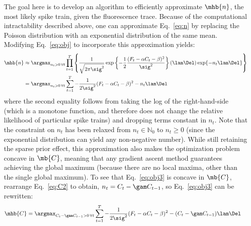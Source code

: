 The goal here is to develop an algorithm to efficiently approximate $\mhb{n}$, the most likely spike train, given the fluorescence trace. Because of the computational intractability described above, one can approximate Eq.~\eqref{eq:n} by replacing the Poisson distribution with an exponential distribution of the same mean. Modifying Eq.~\eqref{eq:obj} to incorporate this approximation yields:
\begin{subequations}
\begin{align} \label{eq:obj2}
\mhb{n} &\approx \argmax_{n_t>0 \, \forall t} \prod_{t=1}^T  \left\{\frac{1}{\sqrt{2 \pi \sig^2}} \exp \left\{-\frac{1}{2}\frac{(F_t - \alpha C_t - \beta)^2}{\sig^2}\right\}  (\lam\Del) \exp\{-n_t \lam\Del \}\right\}
\\ &= \argmax_{n_t>0 \, \forall t}  \sum_{t=1}^T -\frac{1}{2 \sig^2}(F_t - \alpha C_t - \beta)^2  - n_t \lam \Del  \label{eq:obj3}
\end{align}
\end{subequations}
where the second equality follows from taking the log of the right-hand-side (which is a monotone function, and therefore does not change the relative likelihood of particular spike trains) and dropping terms constant in $n_t$.  Note that the constraint on $n_t$ has been relaxed from  $n_t \in \mathbb{N}_0$ to $n_t \geq 0$ (since the exponential distribution can yield any non-negative number).  While still retaining the sparse prior effect, this approximation also makes the optimization problem concave in $\mb{C}$, meaning that any gradient ascent method guarantees achieving the global maximum (because there are no local maxima, other than the single global maximum).  To see that Eq.~\eqref{eq:obj3} is concave in $\mb{C}$, rearrange Eq.~\eqref{eq:C2} to obtain, $n_t=C_t-\gam C_{t-1}$, so Eq.~\eqref{eq:obj3} can be rewritten:
\begin{align}
\mhb{C} &= \argmax_{C_t-\gam C_{t-1}>0 \, \forall t}  \sum_{t=1}^T -\frac{1}{2 \sig^2}(F_t - \alpha C_t - \beta)^2  - (C_t -\gam C_{t-1}) \lam \Del  \label{eq:obj4}
\end{align}
